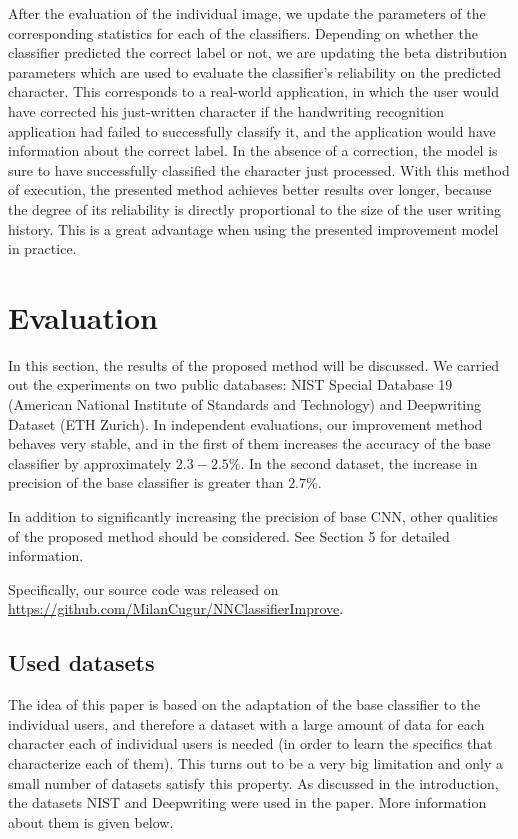 \documentclass{article}
\begin{document}
After the evaluation of the individual image, we update the parameters of the corresponding statistics for each of the classifiers.
Depending on whether the classifier predicted the correct label or not, we are updating the beta distribution parameters which are used to evaluate the classifier's reliability on the predicted character.
This corresponds to a real-world application, in which the user would have corrected his just-written character if the handwriting recognition application had failed to successfully classify it,
and the application would have information about the correct label.
In the absence of a correction, the model is sure to have successfully classified the character just processed.
With this method of execution, the presented method achieves better results over longer, because the degree of its reliability is directly proportional to the size of the user writing history.
This is a great advantage when using the presented improvement model in practice.

\section{Evaluation}

In this section, the results of the proposed method will be discussed.
We carried out the experiments on two public databases: NIST Special Database 19 (American National Institute of Standards and Technology) and
Deepwriting Dataset (ETH Zurich). %
In independent evaluations, our improvement method behaves very stable, and in the first of them increases the accuracy of the base classifier by approximately $2.3-2.5\%$.
In the second dataset, the increase in precision of the base classifier is greater than $2.7\%$.

In addition to significantly increasing the precision of base CNN, other qualities of the proposed method should be considered.
See Section 5 for detailed information. %

Specifically, our source code was released on \url{https://github.com/MilanCugur/NNClassifierImprove}.

\subsection{Used datasets}

The idea of this paper is based on the adaptation of the base classifier to the individual users,
and therefore a dataset with a large amount of data for each character each of individual users is needed
(in order to learn the specifics that characterize each of them).
This turns out to be a very big limitation and only a small number of datasets satisfy this property.
As discussed in the introduction, the datasets NIST and Deepwriting were used in the paper.
More information about them is given below.
\end{document}
